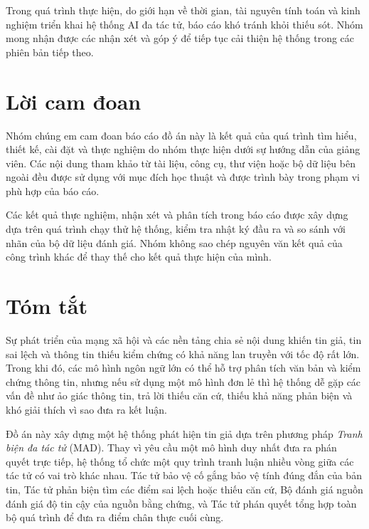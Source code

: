 ﻿\documentclass[oneside,a4paper,12pt]{extreport}
\begin{document}
Trong quá trình thực hiện, do giới hạn về thời gian, tài nguyên tính toán và kinh nghiệm triển khai hệ thống AI đa tác tử, báo cáo khó tránh khỏi thiếu sót. Nhóm mong nhận được các nhận xét và góp ý để tiếp tục cải thiện hệ thống trong các phiên bản tiếp theo.

\chapter*{Lời cam đoan}

Nhóm chúng em cam đoan báo cáo đồ án này là kết quả của quá trình tìm hiểu, thiết kế, cài đặt và thực nghiệm do nhóm thực hiện dưới sự hướng dẫn của giảng viên. Các nội dung tham khảo từ tài liệu, công cụ, thư viện hoặc bộ dữ liệu bên ngoài đều được sử dụng với mục đích học thuật và được trình bày trong phạm vi phù hợp của báo cáo.

Các kết quả thực nghiệm, nhận xét và phân tích trong báo cáo được xây dựng dựa trên quá trình chạy thử hệ thống, kiểm tra nhật ký đầu ra và so sánh với nhãn của bộ dữ liệu đánh giá. Nhóm không sao chép nguyên văn kết quả của công trình khác để thay thế cho kết quả thực hiện của mình.

\chapter*{Tóm tắt}

Sự phát triển của mạng xã hội và các nền tảng chia sẻ nội dung khiến tin giả, tin sai lệch và thông tin thiếu kiểm chứng có khả năng lan truyền với tốc độ rất lớn. Trong khi đó, các mô hình ngôn ngữ lớn có thể hỗ trợ phân tích văn bản và kiểm chứng thông tin, nhưng nếu sử dụng một mô hình đơn lẻ thì hệ thống dễ gặp các vấn đề như ảo giác thông tin, trả lời thiếu căn cứ, thiếu khả năng phản biện và khó giải thích vì sao đưa ra kết luận.

Đồ án này xây dựng một hệ thống phát hiện tin giả dựa trên phương pháp \textit{Tranh biện đa tác tử} (MAD). Thay vì yêu cầu một mô hình duy nhất đưa ra phán quyết trực tiếp, hệ thống tổ chức một quy trình tranh luận nhiều vòng giữa các tác tử có vai trò khác nhau. Tác tử bảo vệ cố gắng bảo vệ tính đúng đắn của bản tin, Tác tử phản biện tìm các điểm sai lệch hoặc thiếu căn cứ, Bộ đánh giá nguồn đánh giá độ tin cậy của nguồn bằng chứng, và Tác tử phán quyết tổng hợp toàn bộ quá trình để đưa ra điểm chân thực cuối cùng.
\end{document}
